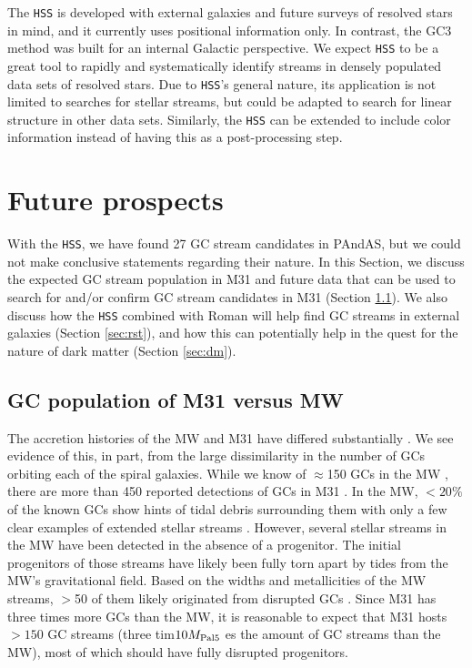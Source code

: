 \documentclass[twocolumn]{aastex631}
\begin{document}
The \texttt{HSS} is developed with external galaxies and future surveys of resolved stars in mind, and it currently uses positional information only. In contrast, the GC3 method \citep[][]{johnston96} was built for an internal Galactic perspective.
We expect \texttt{HSS} to be a great tool to rapidly and systematically identify streams in densely populated data sets of resolved stars. Due to \texttt{HSS}'s general 
nature, its application is not limited to searches for stellar streams, but could be adapted to search for linear structure in other data sets. Similarly, the  \texttt{HSS} can be extended to include color information instead of having this as a post-processing step. 


\section{Future prospects}\label{sec:discussion}
With the \texttt{HSS}, we have found 27 GC stream candidates in PAndAS, but we could not make conclusive statements regarding their nature. In this Section, we discuss the expected GC stream population in M31 and future data that can be used to search for and/or confirm GC stream candidates in M31 (Section \ref{sec:m31vsMW}). We also discuss how the \texttt{HSS} combined with Roman will help find GC streams in external galaxies (Section \ref{sec:rst}), and how this can potentially help in the quest for the nature of dark matter (Section \ref{sec:dm}). 

\subsection{GC population of M31 versus MW}\label{sec:m31vsMW}
The accretion histories of the MW and M31 have differed substantially \citep[e.g.,][]{deason13,mackey19,mackey19b}. We see evidence of this, in part, from the large dissimilarity in the number of GCs orbiting each of the spiral galaxies. While we know of $\approx$150 GCs in the MW \citep[e.g.,][]{harris96}, there are more than 450 reported detections of GCs in M31 \citep[][]{huxor14,caldwell16,mackey19}. In the MW, $<20\%$ of the known GCs show hints of tidal debris surrounding them \citep[e.g.,][]{leon2000,kundu19} with only a few clear examples of extended stellar streams \citep[e.g.,][]{oden01,grillmair06b,ship20}. However, several stellar streams in the MW have been detected in the absence of a progenitor. The initial progenitors of those streams have likely been fully torn apart by tides from the MW's gravitational field. 
Based on the widths and metallicities of the MW streams, $>$50 of them likely originated from disrupted GCs \citep[e.g.,][]{mateu18}. Since M31 has three times more GCs than the MW, it is reasonable to expect that M31 hosts $>150$ GC streams (three tim$10{M}_{\rm Pal 5}$ es the amount of GC streams than the MW), most of which should have fully disrupted progenitors. 
\end{document}
